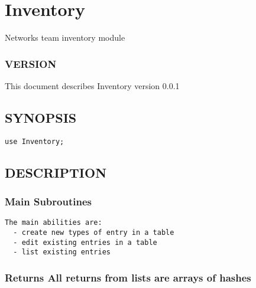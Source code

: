 \documentclass{book}
\begin{document}
\section{Inventory}
\label{_Inventory}
\hypertarget{_Inventory}{}



Networks team inventory module


\subsubsection{VERSION}
\label{Inventory_VERSION}
\hypertarget{Inventory_VERSION}{}



This document describes Inventory version 0.0.1


\subsection{SYNOPSIS}
\label{Inventory_SYNOPSIS}
\hypertarget{Inventory_SYNOPSIS}{}


\begin{Verbatim}[fontfamily=courier,gobble=1,frame=lines,fontsize=\small]
  use Inventory;
\end{Verbatim}


\subsection{DESCRIPTION}
\label{Inventory_DESCRIPTION}
\hypertarget{Inventory_DESCRIPTION}{}


\subsubsection{Main Subroutines}
\label{Inventory_Main_Subroutines}
\hypertarget{Inventory_Main_Subroutines}{}


\begin{Verbatim}[fontfamily=courier,gobble=1,frame=lines,fontsize=\small]
 The main abilities are:
  - create new types of entry in a table
  - edit existing entries in a table
  - list existing entries
\end{Verbatim}


\subsubsection{Returns All returns from lists are arrays of hashes}
\label{Inventory_Returns_All_returns_from_lists_are_arrays_of_hashes}
\hypertarget{Inventory_Returns_All_returns_from_lists_are_arrays_of_hashes}{}
\end{document}
